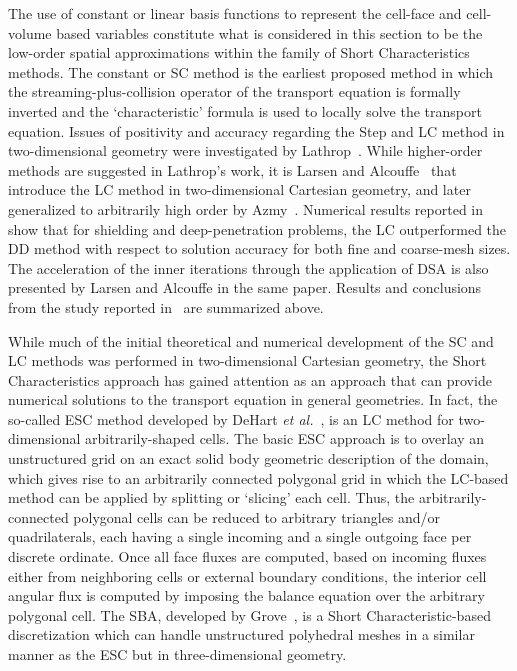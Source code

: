 The use of constant or linear basis functions to represent the cell-face and cell-volume based variables constitute what is considered in this section to be the low-order spatial approximations within the family of Short Characteristics methods.
The constant or \ac{SC} method is the earliest proposed method in which the streaming-plus-collision operator of the transport equation is formally inverted and the ‘characteristic’ formula is used to locally solve the transport equation.
Issues of positivity and accuracy regarding the Step and \ac{LC} method in two-dimensional geometry were investigated by Lathrop~\cite{Lathrop1969}.
While higher-order methods are suggested in Lathrop’s work, it is Larsen and Alcouffe~\cite{Larsen1981} that introduce the \ac{LC} method in two-dimensional Cartesian geometry, and later generalized to arbitrarily high order by Azmy~\cite{Azmy1992}.
Numerical results reported in~\cite{Larsen1981} show that for shielding and deep-penetration problems, the \ac{LC} outperformed the DD method with respect to solution accuracy for both fine and coarse-mesh sizes.
The acceleration of the inner iterations through the application of DSA is also presented by Larsen and Alcouffe in the same paper.
Results and conclusions from the study reported in~\cite{Azmy1992} are summarized above.

While much of the initial theoretical and numerical development of the \ac{SC} and \ac{LC} methods was performed in two-dimensional Cartesian geometry, the Short Characteristics approach has gained attention as an approach that can provide numerical solutions to the transport equation in general geometries.
In fact, the so-called \ac{ESC} method developed by DeHart \textit{et al.}~\cite{DeHart1994}, is an \ac{LC} method for two-dimensional arbitrarily-shaped cells.
The basic \ac{ESC} approach is to overlay an unstructured grid on an exact solid body geometric description of the domain, which gives rise to an arbitrarily connected polygonal grid in which the \ac{LC}-based method can be applied by splitting or ‘slicing’ each cell.
Thus, the arbitrarily-connected polygonal cells can be reduced to arbitrary triangles and/or quadrilaterals, each having a single incoming and a single outgoing face per discrete ordinate.
Once all face fluxes are computed, based on incoming fluxes either from neighboring cells or external boundary conditions, the interior cell angular flux is computed by imposing the balance equation over the arbitrary polygonal cell.
The \ac{SBA}, developed by Grove~\cite{Grove2005}, is a Short Characteristic-based discretization which can handle unstructured polyhedral meshes in a similar manner as the \ac{ESC} but in three-dimensional geometry.

